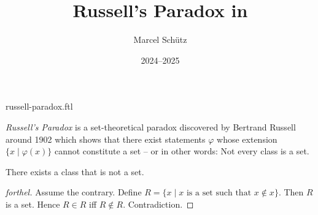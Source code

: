 \documentclass{article}
\title{Russell's Paradox in \Naproche}
\author{Marcel Schütz}
\date{2024--2025}
\begin{document}
\begin{smodule}{russell-paradox.ftl}
\maketitle

\noindent \emph{Russell's Paradox} is a set-theoretical paradox discovered by
Bertrand Russell around 1902 \cite[chapter XV]{Frege1980} which shows that 
there exist statements $\varphi$ whose extension
$\{x\mid\varphi(x)\}$ cannot constitute a set -- or in other words:
Not every class is a set.

\begin{forthel}
  \begin{theorem}[title=Russell's Paradox]
    There exists a class that is not a set.
  \end{theorem}
  \begin{proof}[forthel]
    Assume the contrary.
    Define $R = \{x \mid x \text{ is a set such that } x \notin x\}$.
    Then $R$ is a set.
    Hence $R \in R$ iff $R \notin R$.
    Contradiction.
  \end{proof}
\end{forthel}

\printbibliography
{}
\end{smodule}
\end{document}
